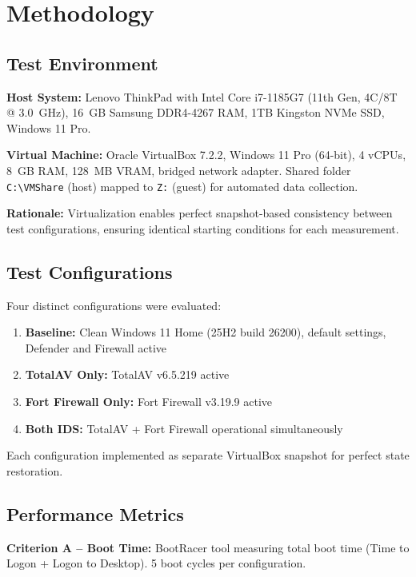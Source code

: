\documentclass[runningheads,a4paper,english]{llncs}[2022/01/12]
\begin{document}
\section{Methodology}
\label{sec:methodology}

\subsection{Test Environment}

\textbf{Host System:} Lenovo ThinkPad with Intel Core i7-1185G7 (11th Gen, 4C/8T @ 3.0~GHz), 16~GB Samsung DDR4-4267 RAM, 1TB Kingston NVMe SSD, Windows 11 Pro.

\textbf{Virtual Machine:} Oracle VirtualBox 7.2.2, Windows 11 Pro (64-bit), 4 vCPUs, 8~GB RAM, 128~MB VRAM, bridged network adapter. Shared folder \texttt{C:\textbackslash VMShare} (host) mapped to \texttt{Z:} (guest) for automated data collection.

\textbf{Rationale:} Virtualization enables perfect snapshot-based consistency between test configurations, ensuring identical starting conditions for each measurement.

\subsection{Test Configurations}

Four distinct configurations were evaluated:
\begin{enumerate}
\item \textbf{Baseline:} Clean Windows 11 Home (25H2 build 26200), default settings, Defender and Firewall active
\item \textbf{TotalAV Only:} TotalAV v6.5.219 active
\item \textbf{Fort Firewall Only:} Fort Firewall v3.19.9 active
\item \textbf{Both IDS:} TotalAV + Fort Firewall operational simultaneously
\end{enumerate}

Each configuration implemented as separate VirtualBox snapshot for perfect state restoration.

\subsection{Performance Metrics}

\textbf{Criterion A -- Boot Time:} BootRacer tool measuring total boot time (Time to Logon + Logon to Desktop). 5 boot cycles per configuration.
\end{document}
